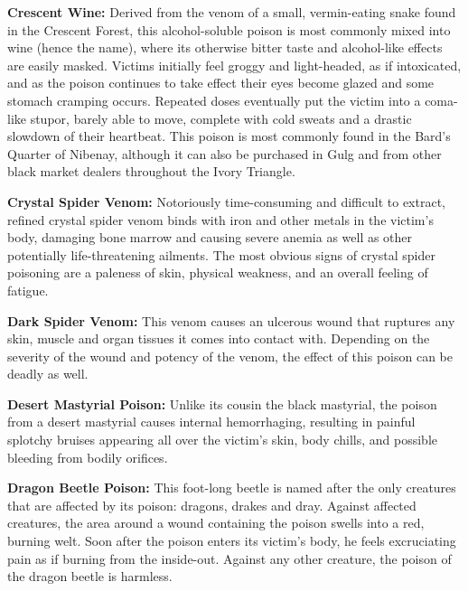 \textbf{Crescent Wine:} Derived from the venom of a small, vermin-eating snake found in the Crescent Forest, this alcohol-soluble poison is most commonly mixed into wine (hence the name), where its otherwise bitter taste and alcohol-like effects are easily masked. Victims initially feel groggy and light-headed, as if intoxicated, and as the poison continues to take effect their eyes become glazed and some stomach cramping occurs. Repeated doses eventually put the victim into a coma-like stupor, barely able to move, complete with cold sweats and a drastic slowdown of their heartbeat. This poison is most commonly found in the Bard's Quarter of Nibenay, although it can also be purchased in Gulg and from other black market dealers throughout the Ivory Triangle.

\textbf{Crystal Spider Venom:} Notoriously time-consuming and difficult to extract, refined crystal spider venom binds with iron and other metals in the victim's body, damaging bone marrow and causing severe anemia as well as other potentially life-threatening ailments. The most obvious signs of crystal spider poisoning are a paleness of skin, physical weakness, and an overall feeling of fatigue.

\textbf{Dark Spider Venom:} This venom causes an ulcerous wound that ruptures any skin, muscle and organ tissues it comes into contact with. Depending on the severity of the wound and potency of the venom, the effect of this poison can be deadly as well.

\textbf{Desert Mastyrial Poison:} Unlike its cousin the black mastyrial, the poison from a desert mastyrial causes internal hemorrhaging, resulting in painful splotchy bruises appearing all over the victim's skin, body chills, and possible bleeding from bodily orifices.

\textbf{Dragon Beetle Poison:} This foot-long beetle is named after the only creatures that are affected by its poison: dragons, drakes and dray. Against affected creatures, the area around a wound containing the poison swells into a red, burning welt. Soon after the poison enters its victim's body, he feels excruciating pain as if burning from the inside-out. Against any other creature, the poison of the dragon beetle is harmless.

